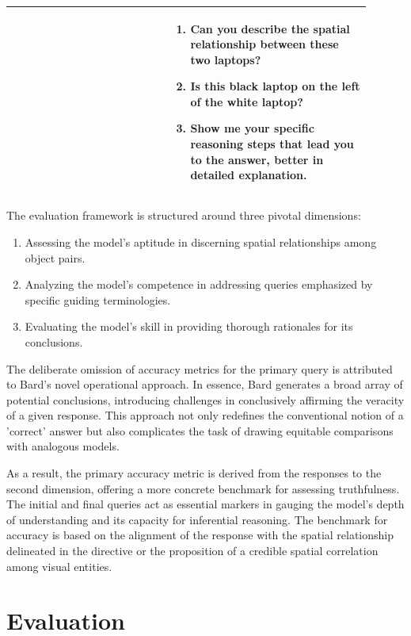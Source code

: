 \documentclass[twocolumn,11pt]{report}
\begin{document}
\begin{table}[ht]
\begin{tabular}{|p{0.4\linewidth}|p{0.5\linewidth}|}
        & \begin{enumerate}
            \item Can you describe the spatial relationship between these two laptops?
            \item Is this black laptop on the left of the white laptop?
            \item Show me your specific reasoning steps that lead you to the answer, better in detailed explanation.
        \end{enumerate}\\
        \hline
        \end{tabular}
\end{table}
The evaluation framework is structured around three pivotal dimensions:
\begin{enumerate}
\item Assessing the model's aptitude in discerning spatial relationships among object pairs.
\item Analyzing the model's competence in addressing queries emphasized by specific guiding terminologies.
\item Evaluating the model's skill in providing thorough rationales for its conclusions.
\end{enumerate}
The deliberate omission of accuracy metrics for the primary query is attributed to Bard's novel operational approach. In essence, Bard generates a broad array of potential conclusions, introducing challenges in conclusively affirming the veracity of a given response. This approach not only redefines the conventional notion of a 'correct' answer but also complicates the task of drawing equitable comparisons with analogous models.

As a result, the primary accuracy metric is derived from the responses to the second dimension, offering a more concrete benchmark for assessing truthfulness. The initial and final queries act as essential markers in gauging the model's depth of understanding and its capacity for inferential reasoning. The benchmark for accuracy is based on the alignment of the response with the spatial relationship delineated in the directive or the proposition of a credible spatial correlation among visual entities.


\chapter{Evaluation}\label{chap:evaluation}
\end{document}
